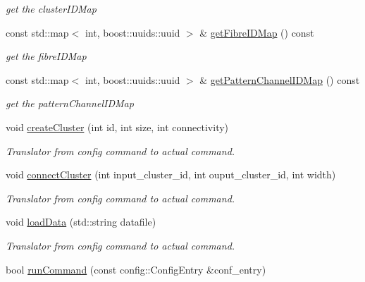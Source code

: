 \begin{DoxyCompactItemize}
\begin{DoxyCompactList}\small\item\em get the cluster\-I\-D\-Map \end{DoxyCompactList}\item 
const std\-::map$<$ int, \*
boost\-::uuids\-::uuid $>$ \& \hyperlink{classcryomesh_1_1manager_1_1Creator_ab4d9444e6760f1dd634db0f07db630bb}{get\-Fibre\-I\-D\-Map} () const 
\begin{DoxyCompactList}\small\item\em get the fibre\-I\-D\-Map \end{DoxyCompactList}\item 
const std\-::map$<$ int, \*
boost\-::uuids\-::uuid $>$ \& \hyperlink{classcryomesh_1_1manager_1_1Creator_a6721fe152f65ef7040b3dfa0cd143dc2}{get\-Pattern\-Channel\-I\-D\-Map} () const 
\begin{DoxyCompactList}\small\item\em get the pattern\-Channel\-I\-D\-Map \end{DoxyCompactList}\item 
void \hyperlink{classcryomesh_1_1manager_1_1Creator_af1395df65f66b2e1af4fdba9afe15cbc}{create\-Cluster} (int id, int size, int connectivity)
\begin{DoxyCompactList}\small\item\em \-Translator from config command to actual command. \end{DoxyCompactList}\item 
void \hyperlink{classcryomesh_1_1manager_1_1Creator_a66333bb0409b2e6de38a58eaddeeb7b1}{connect\-Cluster} (int input\-\_\-cluster\-\_\-id, int ouput\-\_\-cluster\-\_\-id, int width)
\begin{DoxyCompactList}\small\item\em \-Translator from config command to actual command. \end{DoxyCompactList}\item 
void \hyperlink{classcryomesh_1_1manager_1_1Creator_a73a74e5e35b5c969108a99cdf31c5108}{load\-Data} (std\-::string datafile)
\begin{DoxyCompactList}\small\item\em \-Translator from config command to actual command. \end{DoxyCompactList}\item 
bool \hyperlink{classcryomesh_1_1manager_1_1Creator_ad6eb863eb6f8278979e07ef97e9140b5}{run\-Command} (const config\-::\-Config\-Entry \&conf\-\_\-entry)
\item 

\end{DoxyCompactItemize}

